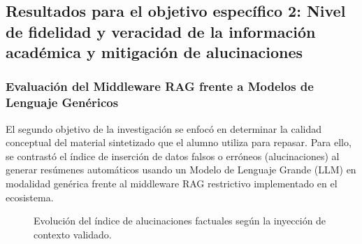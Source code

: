 \subsection{Resultados para el objetivo específico 2: Nivel de fidelidad y veracidad de la información académica y mitigación de alucinaciones}

\subsubsection{Evaluación del Middleware RAG frente a Modelos de Lenguaje Genéricos}

El segundo objetivo de la investigación se enfocó en determinar la calidad conceptual del material sintetizado que el alumno utiliza para repasar. Para ello, se contrastó el índice de inserción de datos falsos o erróneos (alucinaciones) al generar resúmenes automáticos usando un Modelo de Lenguaje Grande (LLM) en modalidad genérica frente al middleware RAG restrictivo implementado en el ecosistema.

\vspace{0.4cm}

\begin{figure}[H]
\centering
{}
\caption{Evolución del índice de alucinaciones factuales según la inyección de contexto validado.}
\label{fig:sta_lta_itej}
\end{figure}

\vspace{0.4cm}

